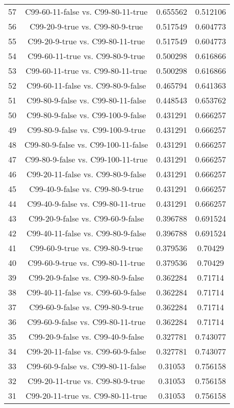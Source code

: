 \documentclass[a4paper,10pt]{article}
\begin{document}
\begin{landscape}
\begin{table}[!htp]
\begin{tabular}{cccc}
57&C99-60-11-false vs. C99-80-11-true&0.655562&0.512106\\
56&C99-20-9-true vs. C99-80-9-true&0.517549&0.604773\\
55&C99-20-9-true vs. C99-80-11-true&0.517549&0.604773\\
54&C99-60-11-true vs. C99-80-9-true&0.500298&0.616866\\
53&C99-60-11-true vs. C99-80-11-true&0.500298&0.616866\\
52&C99-60-11-false vs. C99-80-9-false&0.465794&0.641363\\
51&C99-80-9-false vs. C99-80-11-false&0.448543&0.653762\\
50&C99-80-9-false vs. C99-100-9-false&0.431291&0.666257\\
49&C99-80-9-false vs. C99-100-9-true&0.431291&0.666257\\
48&C99-80-9-false vs. C99-100-11-false&0.431291&0.666257\\
47&C99-80-9-false vs. C99-100-11-true&0.431291&0.666257\\
46&C99-20-11-false vs. C99-80-9-false&0.431291&0.666257\\
45&C99-40-9-false vs. C99-80-9-true&0.431291&0.666257\\
44&C99-40-9-false vs. C99-80-11-true&0.431291&0.666257\\
43&C99-20-9-false vs. C99-60-9-false&0.396788&0.691524\\
42&C99-40-11-false vs. C99-80-9-false&0.396788&0.691524\\
41&C99-60-9-true vs. C99-80-9-true&0.379536&0.70429\\
40&C99-60-9-true vs. C99-80-11-true&0.379536&0.70429\\
39&C99-20-9-false vs. C99-80-9-false&0.362284&0.71714\\
38&C99-40-11-false vs. C99-60-9-false&0.362284&0.71714\\
37&C99-60-9-false vs. C99-80-9-true&0.362284&0.71714\\
36&C99-60-9-false vs. C99-80-11-true&0.362284&0.71714\\
35&C99-20-9-false vs. C99-40-9-false&0.327781&0.743077\\
34&C99-20-11-false vs. C99-60-9-false&0.327781&0.743077\\
33&C99-60-9-false vs. C99-80-11-false&0.31053&0.756158\\
32&C99-20-11-true vs. C99-80-9-true&0.31053&0.756158\\
31&C99-20-11-true vs. C99-80-11-true&0.31053&0.756158\\

\end{tabular}
\end{table}
\end{landscape}
\end{document}
